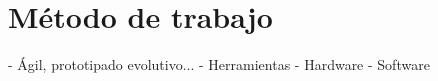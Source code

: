 \chapter{Método de trabajo}
\label{chap:metodo}

- Ágil, prototipado evolutivo...
- Herramientas
   - Hardware
   - Software

